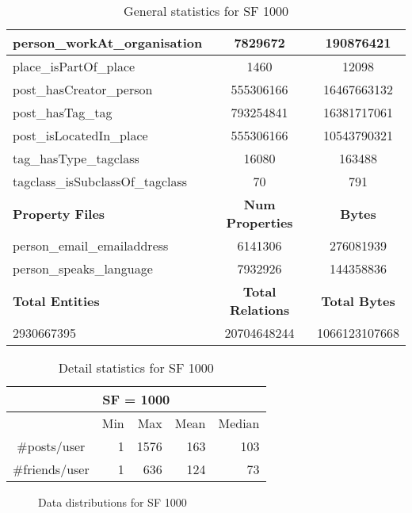 \begin{table}[H]
\begin{tabular} {| l | c | c |}
\hline
person\_workAt\_organisation & 7829672 & 190876421 \\
\hline
place\_isPartOf\_place & 1460 & 12098 \\
\hline
post\_hasCreator\_person & 555306166 & 16467663132 \\
\hline
post\_hasTag\_tag & 793254841 & 16381717061 \\
\hline
post\_isLocatedIn\_place & 555306166 & 10543790321 \\
\hline
tag\_hasType\_tagclass & 16080 & 163488 \\
\hline
tagclass\_isSubclassOf\_tagclass & 70 & 791 \\
\hline \hline
\textbf{Property Files} & \textbf{Num Properties} & \textbf{Bytes} \\
\hline \hline
person\_email\_emailaddress & 6141306 & 276081939 \\
\hline
person\_speaks\_language & 7932926 & 144358836 \\
\hline \hline
\textbf{Total Entities} & \textbf{Total Relations} & \textbf{Total Bytes} \\
\hline \hline
 2930667395 & 20704648244 & 1066123107668 \\
\hline
\end{tabular}
\caption{ General statistics for SF 1000}
\end{table}

\begin{table}[H]
    \centering
    \begin{tabular}{|c||r|r|r|r|}
\hline    \multicolumn{5}{|c|}{SF = 1000 }  \\
\hline & Min & Max & Mean & Median   \\
\hline  \#posts/user  &1 &  1576 & 163 & 103 \\
\hline  \#friends/user  &1 &  636 & 124 & 73 \\
\hline
\end{tabular}
\caption{Detail statistics for SF 1000}
\end{table}

\begin{figure}[H]
\begin{center}
  \caption{Data distributions for SF 1000}
  \label{fig:datadistSF1000}
\end{center}
\end{figure}

